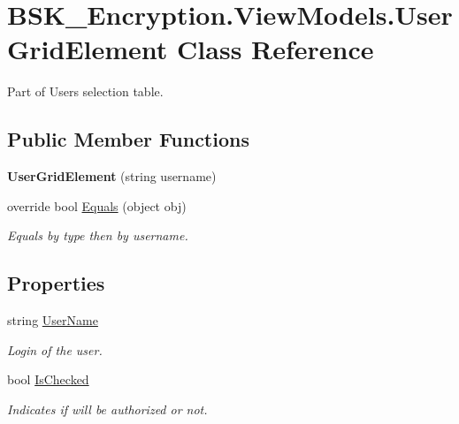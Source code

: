 \hypertarget{class_b_s_k___encryption_1_1_view_models_1_1_user_grid_element}{}\section{B\+S\+K\+\_\+\+Encryption.\+View\+Models.\+User\+Grid\+Element Class Reference}
\label{class_b_s_k___encryption_1_1_view_models_1_1_user_grid_element}


Part of Users selection table.  


\subsection*{Public Member Functions}
\begin{DoxyCompactItemize}
\item 
\mbox{\label{class_b_s_k___encryption_1_1_view_models_1_1_user_grid_element_a785c9d979f002992926399ff1324b56e}} 
{\bfseries User\+Grid\+Element} (string username)
\item 
override bool \mbox{\hyperlink{class_b_s_k___encryption_1_1_view_models_1_1_user_grid_element_a5819f5e5be4cb5d76ceca220683689ce}{Equals}} (object obj)
\begin{DoxyCompactList}\small\item\em Equals by type then by username. \end{DoxyCompactList}\end{DoxyCompactItemize}
\subsection*{Properties}
\begin{DoxyCompactItemize}
\item 
string \mbox{\hyperlink{class_b_s_k___encryption_1_1_view_models_1_1_user_grid_element_a51f91f62aeffe54cd095deb969370f56}{User\+Name}}
\begin{DoxyCompactList}\small\item\em Login of the user. \end{DoxyCompactList}\item 
bool \mbox{\hyperlink{class_b_s_k___encryption_1_1_view_models_1_1_user_grid_element_ae2897007d40f48fe6267173a84aeac24}{Is\+Checked}}
\begin{DoxyCompactList}\small\item\em Indicates if will be authorized or not. \end{DoxyCompactList}\end{DoxyCompactItemize}


